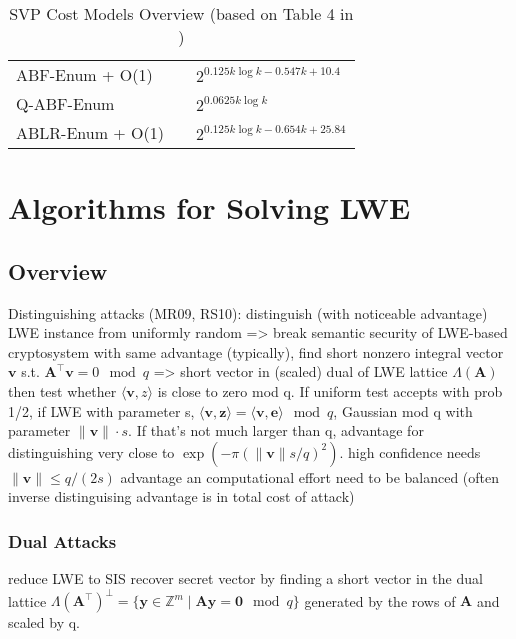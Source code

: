 \begin{table}
\begin{tabular}{lll}
    ABF-Enum + O(1)                  & \cite{ABFKSW20}                 & $2^{0.125k \log k - 0.547k + 10.4}$   \\
    Q-ABF-Enum                       & \cite{ABFKSW20}                 & $2^{0.0625 k \log k}$                 \\
    ABLR-Enum + O(1)                 & \cite{ABLR21}                   & $2^{0.125k \log k - 0.654k + 25.84}$  \\
    \bottomrule
  \end{tabular}
  \caption{SVP Cost Models Overview (based on Table 4 in \cite{ACDDPPVW18})} %
  \label{tab:costmodels}
\end{table} %


\section{Algorithms for Solving LWE}
\subsection{Overview}
Distinguishing attacks (MR09, RS10): distinguish (with noticeable advantage) LWE instance from uniformly random => break semantic security of LWE-based cryptosystem with same advantage (typically), find short nonzero integral vector $\mathbf{v}$ s.t. $\mathbf{A}^\intercal \mathbf{v} = 0 \mod q$ => short vector in (scaled) dual of LWE lattice $\Lambda(\mathbf{A})$ %
then test whether $\langle \mathbf{v}, z \rangle$ is close to zero mod q. If uniform test accepts with prob 1/2, if LWE with parameter s, $\langle \mathbf{v}, \mathbf{z} \rangle = \langle \mathbf{v}, \mathbf{e} \rangle \mod q$, Gaussian mod q with parameter $\| \mathbf{v} \| \cdot s$. If that's not much larger than q, advantage for distinguishing very close to $\exp(-\pi (\| \mathbf{v} \| s/q)^2)$. high confidence needs $\| \mathbf{v} \| \leq q/(2s)$
advantage an computational effort need to be balanced (often inverse distinguising advantage is in total cost of attack)

\subsubsection{Dual Attacks}
reduce LWE to SIS
recover secret vector by finding a short vector in the dual lattice $\Lambda(\mathbf{A}^\intercal)^{\perp} = \{ \mathbf{y} \in \mathbb{Z}^m \mid \mathbf{A} \mathbf{y} = \mathbf{0} \mod q\}$ generated by the rows of $\mathbf{A}$ and scaled by q.
